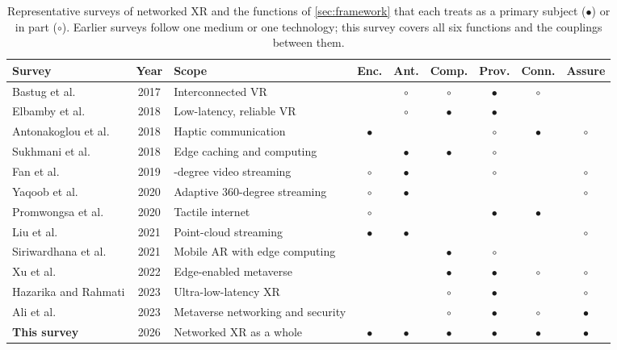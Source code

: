 \begin{table}[t]
\centering\small
\caption{Representative surveys of networked XR and the functions of \cref{sec:framework} that each
treats as a primary subject ($\bullet$) or in part ($\circ$). Earlier surveys follow one medium or one
technology; this survey covers all six functions and the couplings between them.}\label{tab:surveys}
\setlength{\tabcolsep}{3.2pt}
\newcommand{\y}{$\bullet$}\newcommand{\p}{$\circ$}
\begin{tabularx}{\linewidth}{@{}>{\raggedright\arraybackslash}X c >{\raggedright\arraybackslash}p{3.3cm}cccccc@{}}
\toprule
Survey & Year & Scope & Enc. & Ant. & Comp. & Prov. & Conn. & Assure\\
\midrule
Bastug et al.\ \cite{W2561715836} & 2017 & Interconnected VR & & \p & \p & \y & \p & \\
Elbamby et al.\ \cite{W2784711283} & 2018 & Low-latency, reliable VR & & \p & \y & \y & & \\
Antonakoglou et al.\ \cite{W2811040154} & 2018 & Haptic communication & \y & & & \p & \y & \p\\
Sukhmani et al.\ \cite{W2902319104} & 2018 & Edge caching and computing & & \y & \y & \p & & \\
Fan et al.\ \cite{W2971680322} & 2019 & 360-degree video streaming & \p & \y & & \p & & \p\\
Yaqoob et al.\ \cite{W3038754372} & 2020 & Adaptive 360-degree streaming & \p & \y & & & & \p\\
Promwongsa et al.\ \cite{W3088582486} & 2020 & Tactile internet & \p & & & \y & \y & \\
Liu et al.\ \cite{W3096564590} & 2021 & Point-cloud streaming & \y & \y & & & & \p\\
Siriwardhana et al.\ \cite{W3133913697} & 2021 & Mobile AR with edge computing & & & \y & \p & & \\
Xu et al.\ \cite{W4312940001} & 2022 & Edge-enabled metaverse & & & \y & \y & \p & \p\\
Hazarika and Rahmati \cite{W4362585626} & 2023 & Ultra-low-latency XR & & & \p & \y & & \p\\
Ali et al.\ \cite{W4390204075} & 2023 & Metaverse networking and security & & & \p & \y & \p & \y\\
\textbf{This survey} & 2026 & Networked XR as a whole & \y & \y & \y & \y & \y & \y\\
\bottomrule
\end{tabularx}
\end{table}

